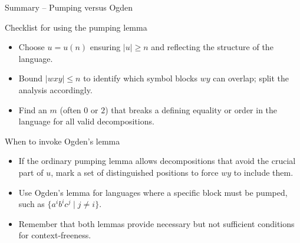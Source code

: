 \begin{frame}[t]{Summary – Pumping versus Ogden}
  \begin{tblock}{Checklist for using the pumping lemma}
    \begin{itemize}
      \item Choose $u = u(n)$ ensuring $|u| \ge n$ and reflecting the
        structure of the language.
      \item Bound $|w x y| \le n$ to identify which symbol blocks $w y$
        can overlap; split the analysis accordingly.
      \item Find an $m$ (often $0$ or $2$) that breaks a defining
        equality or order in the language for all valid decompositions.
    \end{itemize}
  \end{tblock}
  \begin{tblock}{When to invoke Ogden’s lemma}
    \begin{itemize}
      \item If the ordinary pumping lemma allows decompositions that
        avoid the crucial part of $u$, mark a set of distinguished
        positions to force $w y$ to include them.
      \item Use Ogden’s lemma for languages where a specific block must
        be pumped, such as $\{a^i b^i c^j \mid j \ne i\}$.
      \item Remember that both lemmas provide necessary but not
        sufficient conditions for context‑freeness.
    \end{itemize}
  \end{tblock}
  \label{fr:6.1-28}
\end{frame}

